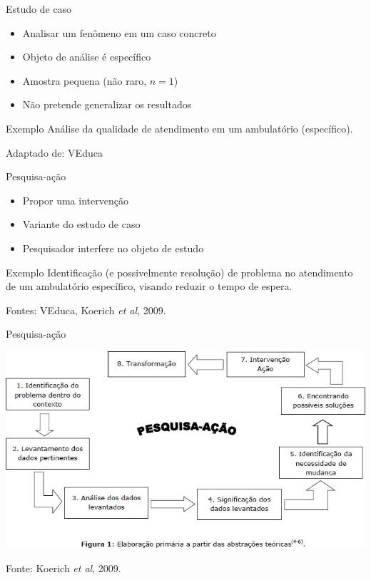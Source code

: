 \documentclass{beamer}
\begin{document}
\begin{frame}{Estudo de caso}
  \begin{itemize}
    \footnotesize
  \item Analisar um fenômeno em um caso concreto
  \item Objeto de análise é específico
  \item Amostra pequena (não raro, $n=1$)
  \item Não pretende generalizar os resultados
  \end{itemize}
  \begin{exampleblock}{Exemplo}
    \scriptsize
    Análise da qualidade de atendimento em um ambulatório (específico).
  \end{exampleblock}

  \vfill
  \scriptsize
  Adaptado de: VEduca
\end{frame}

\begin{frame}{Pesquisa-ação}
  \begin{itemize}
    \footnotesize
  \item Propor uma \alert{intervenção}
  \item Variante do estudo de caso
  \item Pesquisador interfere no objeto de estudo
  \end{itemize}
  \begin{exampleblock}{Exemplo}
    \scriptsize
    Identificação (e possivelmente resolução) de problema no
    atendimento de um ambulatório específico, visando reduzir o tempo
    de espera.
  \end{exampleblock}

  \vfill
  \scriptsize
  Fontes: VEduca, Koerich {\em et al}, 2009.
\end{frame}

\begin{frame}{Pesquisa-ação}
  \begin{center}
    \includegraphics[width=\textwidth]{EstruturaI/pesquisa-acao}
  \end{center}

  \vfill
  \scriptsize
  Fonte: Koerich {\em et al}, 2009.
\end{frame}
\end{document}
